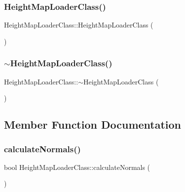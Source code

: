 \subsubsection{\texorpdfstring{Height\+Map\+Loader\+Class()}{HeightMapLoaderClass()}\hspace{0.1cm}{\footnotesize\ttfamily [2/2]}}
{\footnotesize\ttfamily Height\+Map\+Loader\+Class\+::\+Height\+Map\+Loader\+Class (\begin{DoxyParamCaption}\item[{const \hyperlink{class_height_map_loader_class}{Height\+Map\+Loader\+Class} \&}]{ }\end{DoxyParamCaption})}

\mbox{\label{class_height_map_loader_class_ac99f21f7ee38e388974bfd710d800ea0}} 
\subsubsection{\texorpdfstring{$\sim$\+Height\+Map\+Loader\+Class()}{~HeightMapLoaderClass()}}
{\footnotesize\ttfamily Height\+Map\+Loader\+Class\+::$\sim$\+Height\+Map\+Loader\+Class (\begin{DoxyParamCaption}{ }\end{DoxyParamCaption})}



\subsection{Member Function Documentation}
\mbox{\label{class_height_map_loader_class_a8474fae8a6fb8e4d2b1cddbcf24c0311}} 
\subsubsection{\texorpdfstring{calculate\+Normals()}{calculateNormals()}}
{\footnotesize\ttfamily bool Height\+Map\+Loader\+Class\+::calculate\+Normals (\begin{DoxyParamCaption}{ }\end{DoxyParamCaption})\hspace{0.3cm}{\ttfamily [private]}}



